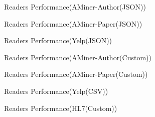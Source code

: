 \documentclass[sigconf,nonacm,screen]{acmart}
\begin{document}
   
    
    \begin{figure}[h]
        \centering
        
        \caption{Readers Performance(AMiner-Author(JSON))}
    \end{figure}

    \begin{figure}[h]
        \centering
        
        \caption{Readers Performance(AMiner-Paper(JSON))}
    \end{figure}

    \begin{figure}[h]
        \centering
        
        \caption{Readers Performance(Yelp(JSON))}
    \end{figure}

    \begin{figure}[h]
        \centering
        
        \caption{Readers Performance(AMiner-Author(Custom))}
    \end{figure}

    \begin{figure}[h]
        \centering
        
        \caption{Readers Performance(AMiner-Paper(Custom))}
    \end{figure}

    \begin{figure}[h]
        \centering
        
        \caption{Readers Performance(Yelp(CSV))}
    \end{figure}

    \begin{figure}[h]
        \centering
        
        \caption{Readers Performance(HL7(Custom))}
    \end{figure}   
\end{document}

